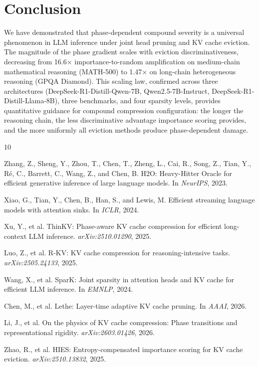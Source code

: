 \documentclass[11pt,a4paper]{article}
\begin{document}
\section{Conclusion}

We have demonstrated that phase-dependent compound severity is a universal phenomenon in LLM inference under joint head pruning and KV cache eviction. The magnitude of the phase gradient scales with eviction discriminativeness, decreasing from 16.6$\times$ importance-to-random amplification on medium-chain mathematical reasoning (MATH-500) to 1.47$\times$ on long-chain heterogeneous reasoning (GPQA Diamond). This scaling law, confirmed across three architectures (DeepSeek-R1-Distill-Qwen-7B, Qwen2.5-7B-Instruct, DeepSeek-R1-Distill-Llama-8B), three benchmarks, and four sparsity levels, provides quantitative guidance for compound compression configuration: the longer the reasoning chain, the less discriminative advantage importance scoring provides, and the more uniformly all eviction methods produce phase-dependent damage.


\begin{thebibliography}{10}

Zhang, Z., Sheng, Y., Zhou, T., Chen, T., Zheng, L., Cai, R., Song, Z., Tian, Y., Ré, C., Barrett, C., Wang, Z., and Chen, B.
\newblock H2O: Heavy-Hitter Oracle for efficient generative inference of large language models.
\newblock In \emph{NeurIPS}, 2023.

Xiao, G., Tian, Y., Chen, B., Han, S., and Lewis, M.
\newblock Efficient streaming language models with attention sinks.
\newblock In \emph{ICLR}, 2024.

Xu, Y., et al.
\newblock ThinKV: Phase-aware KV cache compression for efficient long-context LLM inference.
\newblock \emph{arXiv:2510.01290}, 2025.

Luo, Z., et al.
\newblock R-KV: KV cache compression for reasoning-intensive tasks.
\newblock \emph{arXiv:2505.24133}, 2025.

Wang, X., et al.
\newblock SparK: Joint sparsity in attention heads and KV cache for efficient LLM inference.
\newblock In \emph{EMNLP}, 2024.

Chen, M., et al.
\newblock Lethe: Layer-time adaptive KV cache pruning.
\newblock In \emph{AAAI}, 2026.

Li, J., et al.
\newblock On the physics of KV cache compression: Phase transitions and representational rigidity.
\newblock \emph{arXiv:2603.01426}, 2026.

Zhao, R., et al.
\newblock HIES: Entropy-compensated importance scoring for KV cache eviction.
\newblock \emph{arXiv:2510.13832}, 2025.

\end{thebibliography}
\end{document}
